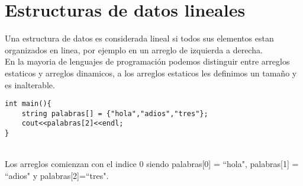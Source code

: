 \section{Estructuras de datos lineales}

Una estructura de datos es considerada lineal si todos sus elementos estan organizados en linea, por ejemplo en un arreglo de izquierda a derecha.
\\En la mayoria de lenguajes de programación podemos distinguir entre arreglos estaticos y arreglos dinamicos, a los arreglos estaticos les definimos un tamaño y es inalterable. 
\\\begin{minipage}{\textwidth}
\begin{lstlisting}[style=C,caption=arregloEstatico.cpp]
int main(){
    string palabras[] = {"hola","adios","tres"};
    cout<<palabras[2]<<endl;
}
\end{lstlisting}
\end{minipage}
\\Los arreglos comienzan con el indice 0 siendo palabras[0] = ``hola", palabras[1] = ``adios"{} y palabras[2]=``tres".
